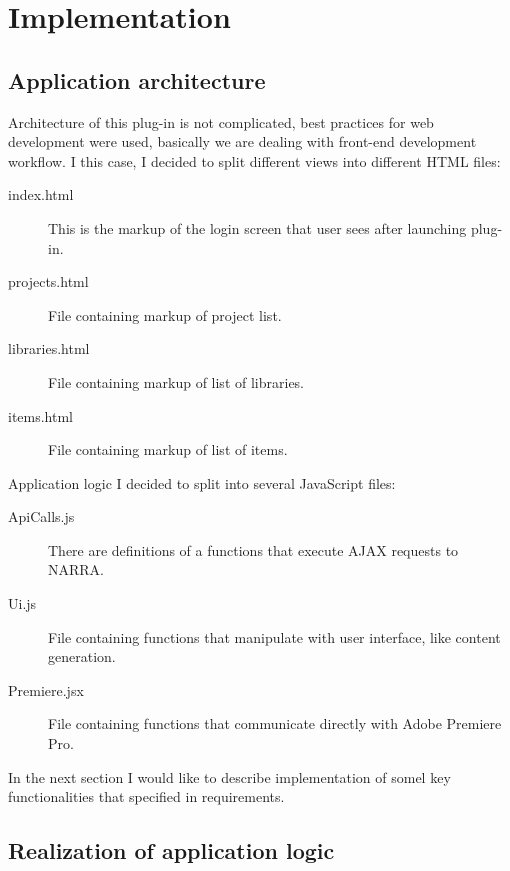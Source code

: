 \documentclass[thesis=B,english]{FITthesis}[2012/10/20]
\begin{document}
\chapter{Implementation}
\section{Application architecture}
Architecture of this plug-in is not complicated, best practices for web development were used, basically we are dealing with front-end development workflow. I this case, I decided to split different views into different HTML files:
	\begin{description}
		\item [index.html] This is the markup of the login screen that user sees after launching plug-in.
		\item [projects.html] File containing markup of project list.
		\item [libraries.html] File containing markup of list of libraries.
		\item [items.html] File containing markup of list of items.
	\end{description}
Application logic I decided to split into several JavaScript files:
	\begin{description}
		\item [ApiCalls.js] There are definitions of a functions that execute AJAX requests to NARRA.
		\item [Ui.js] File containing functions that manipulate with user interface, like content generation.
		\item [Premiere.jsx] File containing functions that communicate directly with Adobe Premiere Pro.
	\end{description}
In the next section I would like to describe implementation of somel key functionalities that specified in requirements.
\section{Realization of application logic}
\end{document}

